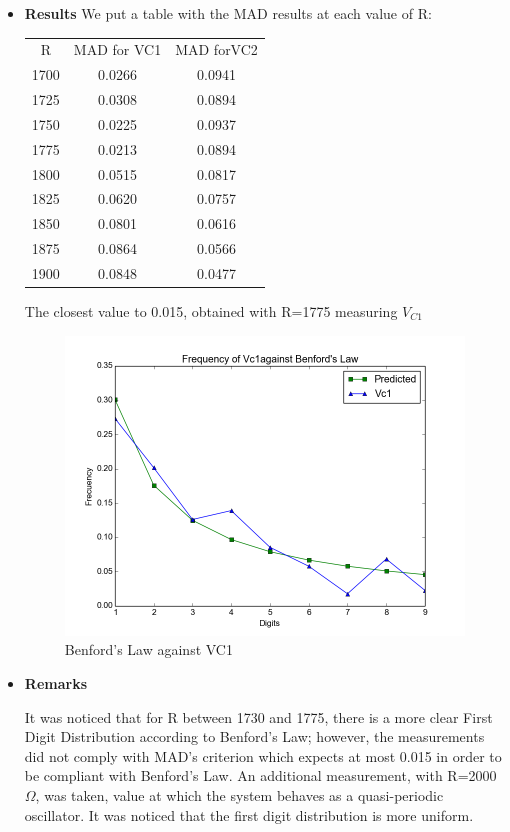 \begin{itemize}
  \item \textbf{Results}
We put a table with the MAD results at each value of R:
\begin{center}
    \begin{tabular}{ c | c | c }
        R & MAD for VC1 & MAD forVC2\\
        1700 & 0.0266 & 0.0941\\ \hline
        1725 & 0.0308 & 0.0894\\ \hline
        1750 & 0.0225 & 0.0937\\ \hline
        1775 & 0.0213 & 0.0894\\ \hline
        1800 & 0.0515 & 0.0817\\ \hline
        1825 & 0.0620 & 0.0757\\ \hline
        1850 & 0.0801 & 0.0616\\ \hline
        1875 & 0.0864 & 0.0566\\ \hline
        1900 & 0.0848 & 0.0477\\ \hline


    \end{tabular}
\end{center}

The closest value to 0.015, obtained with R=1775 measuring $V_{C1}$
\begin{figure}[H]
    \centering
    \includegraphics[scale=0.4]{imagenes/2-benford/benford_chua1775.png}
    \caption{Benford's Law against VC1}
\end{figure}
\item \textbf{Remarks}

It was noticed that for R between 1730 and 1775, there is a more clear First Digit Distribution according to Benford's Law; however, the measurements did not comply with MAD's criterion which expects at most 0.015 in order to be compliant with Benford's Law. An additional measurement, with R=2000$\Omega$, was taken, value at which the system behaves as a quasi-periodic oscillator. It was noticed that the first digit distribution is more uniform.


\end{itemize}
